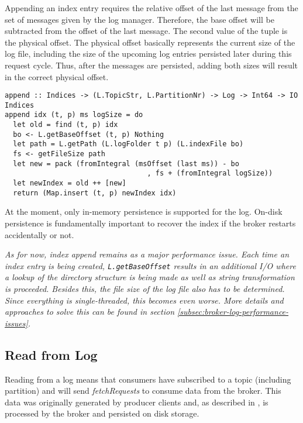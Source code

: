 Appending an index entry requires the relative offset of the last message from
the set of messages given by the log manager. Therefore, the base offset will be
subtracted from the offset of the last message. The second value of the tuple is
the physical offset. The physical offset basically represents the current size
of the log file, including the size of the upcoming log entries persisted later
during this request cycle. Thus, after the messages are persisted, adding both
sizes will result in the correct physical offset.

\begin{lstlisting}[caption={Appending entry to index}]
append :: Indices -> (L.TopicStr, L.PartitionNr) -> Log -> Int64 -> IO Indices
append idx (t, p) ms logSize = do
  let old = find (t, p) idx
  bo <- L.getBaseOffset (t, p) Nothing 
  let path = L.getPath (L.logFolder t p) (L.indexFile bo)
  fs <- getFileSize path
  let new = pack (fromIntegral (msOffset (last ms)) - bo
                                  , fs + (fromIntegral logSize)) 
  let newIndex = old ++ [new]
  return (Map.insert (t, p) newIndex idx)
\end{lstlisting}

At the moment, only in-memory persistence is supported for the log. On-disk
persistence is fundamentally important to recover the index if the broker
restarts accidentally or not.

\textit{As for now, index append remains as a major performance issue. Each time
  an index entry is being created, \lstinline{L.getBaseOffset} results in an
  additional I/O where a lookup of the directory structure is being made as well
  as string transformation is proceeded. Besides this, the file size of the log
file also has to be determined. Since everything is single-threaded, this
becomes even worse. More details and approaches to solve this can be found in
section \ref{subsec:broker-log-performance-issues}.}


\subsection{Read from Log}
\label{subsec:broker-log-read}

Reading from a log means that consumers have subscribed to a topic (including
partition) and will send \textit{fetchRequests} to consume data from the broker.
This data was originally generated by producer clients and, as described in
\label{subsec:broker-log-append}, is processed by the broker and persisted on
disk storage.

